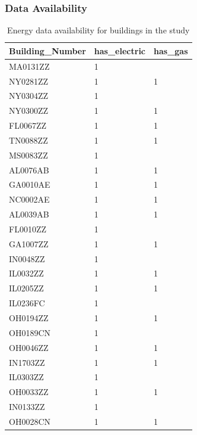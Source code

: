 \documentclass[12pt]{article}
\begin{document}
\subsubsection{Data Availability}
\begin{longtable}{lll}
\caption{Energy data availability for buildings in the study}\\
\label{tab:energy_avail}
Building\_Number & has\_electric & has\_gas \\ \hline \hline \endhead
MA0131ZZ         & 1             &          \\
NY0281ZZ         & 1             & 1        \\
NY0304ZZ         & 1             &          \\
NY0300ZZ         & 1             & 1        \\
FL0067ZZ         & 1             & 1        \\
TN0088ZZ         & 1             & 1        \\
MS0083ZZ         & 1             &          \\
AL0076AB         & 1             & 1        \\
GA0010AE         & 1             & 1        \\
NC0002AE         & 1             & 1        \\
AL0039AB         & 1             & 1        \\
FL0010ZZ         & 1             &          \\
GA1007ZZ         & 1             & 1        \\
IN0048ZZ         & 1             &          \\
IL0032ZZ         & 1             & 1        \\
IL0205ZZ         & 1             & 1        \\
IL0236FC         & 1             &          \\
OH0194ZZ         & 1             & 1        \\
OH0189CN         & 1             &          \\
OH0046ZZ         & 1             & 1        \\
IN1703ZZ         & 1             & 1        \\
IL0303ZZ         & 1             &          \\
OH0033ZZ         & 1             & 1        \\
IN0133ZZ         & 1             &          \\
OH0028CN         & 1             & 1        \\

\end{longtable}
\end{document}

